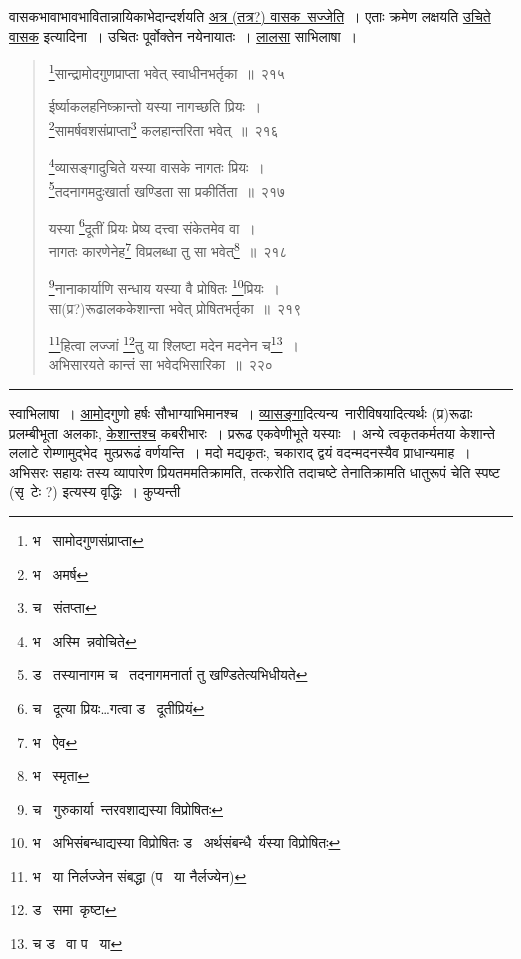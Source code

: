 \documentclass[11pt, openany]{book}
\begin{document}
वासकभावाभावभावितान्नायिकाभेदान्दर्शयति \underline{अत्र (तत्र?) वासक\textendash\ सज्जेति}~। एताः क्रमेण लक्षयति \underline{उचिते वासक} इत्यादिना~। उचितः पूर्वोक्तेन नयेनायातः~। \underline{लालसा} साभिलाषा~।

\newpage
\begin{quote}
{\na \renewcommand{\thefootnote}{1}\footnote{भ \textendash\  सामोदगुणसंप्राप्ता}सान्द्रामोदगुणप्राप्ता भवेत् स्वाधीनभर्तृका~॥~२१५

ईर्ष्याकलहनिष्क्रान्तो यस्या नागच्छति प्रियः~।\\
\renewcommand{\thefootnote}{2}\footnote{भ \textendash\  अमर्ष}सामर्षवशसंप्राप्ता\renewcommand{\thefootnote}{3}\footnote{च \textendash\  संतप्ता} कलहान्तरिता भवेत्~॥~२१६

\renewcommand{\thefootnote}{4}\footnote{भ \textendash\  अस्मि\textendash\ न्नवोचिते}व्यासङ्गादुचिते यस्या वासके नागतः प्रियः~।\\
\renewcommand{\thefootnote}{5}\footnote{ड \textendash\  तस्यानागम च \textendash\  तदनागमनार्ता तु खण्डितेत्यभिधीयते}तदनागमदुःखार्ता खण्डिता सा प्रकीर्तिता~॥~२१७

यस्या \renewcommand{\thefootnote}{6}\footnote{च \textendash\  दूत्या प्रियः\ldots गत्वा ड \textendash\  दूतीप्रियं}दूतीं प्रियः प्रेष्य दत्त्वा संकेतमेव वा~।\\
नागतः कारणेनेह\renewcommand{\thefootnote}{7}\footnote{भ \textendash\  ऐव} विप्रलब्धा तु सा भवेत्\renewcommand{\thefootnote}{8}\footnote{भ \textendash\  स्मृता}~॥~२१८

\renewcommand{\thefootnote}{9}\footnote{च \textendash\  गुरुकार्या\textendash\ न्तरवशाद्यस्या विप्रोषितः}नानाकार्याणि सन्धाय यस्या वै प्रोषितः \renewcommand{\thefootnote}{10}\footnote{भ \textendash\  अभिसंबन्धाद्यस्या विप्रोषितः ड \textendash\  अर्थसंबन्धै\textendash\ र्यस्या विप्रोषितः}प्रियः~।\\
सा(प्र?)रूढालककेशान्ता भवेत् प्रोषितभर्तृका~॥~२१९

\renewcommand{\thefootnote}{11}\footnote{भ \textendash\  या निर्लज्जेन संबद्धा (प \textendash\  या नैर्लज्येन)}हित्वा लज्जां \renewcommand{\thefootnote}{12}\footnote{ड \textendash\  समा\textendash\ कृष्टा}तु या श्लिष्टा मदेन मदनेन च\renewcommand{\thefootnote}{13}\footnote{च ड \textendash\  वा प \textendash\  या}~।\\
अभिसारयते कान्तं सा भवेदभिसारिका~॥~२२०}
\end{quote}

\hrule

\vspace{2mm}
\noindent
स्वाभिलाषा~। \underline{आमो}दगुणो हर्षः सौभाग्याभिमानश्च~। \underline{व्यासङ्गा}दित्यन्य\textendash\ नारीविषयादित्यर्थः (प्र)रूढाः प्रलम्बीभूता अलकाः, \underline{केशान्तश्च} कबरीभारः~। प्ररूढ एकवेणीभूते यस्याः~। अन्ये त्वकृतकर्मतया केशान्ते ललाटे रोम्णामुद्भेद\textendash\ मुत्प्ररूढं वर्णयन्ति~। मदो मद्यकृतः, चकाराद् द्वयं वदन्मदनस्यैव प्राधान्यमाह~। अभिसरः सहायः तस्य व्यापारेण प्रियतममतिक्रामति, {\qt तत्करोति तदाचष्टे तेनातिक्रामति धातुरूपं} चेति स्पष्ट (सृ\textendash\ टेः ?) इत्यस्य वृद्धिः~। कुप्यन्ती
\end{document}
